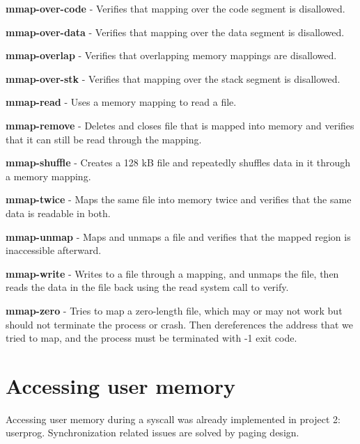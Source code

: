 \textbf{mmap-over-code} - Verifies that mapping over the code segment is disallowed.


\textbf{mmap-over-data} - Verifies that mapping over the data segment is disallowed.


\textbf{mmap-overlap} - Verifies that overlapping memory mappings are disallowed.


\textbf{mmap-over-stk} - Verifies that mapping over the stack segment is disallowed.


\textbf{mmap-read} - Uses a memory mapping to read a file.


\textbf{mmap-remove} - Deletes and closes file that is mapped into memory and verifies that it can still be read through the mapping.


\textbf{mmap-shuffle} - Creates a 128 kB file and repeatedly shuffles data in it through a memory mapping.


\textbf{mmap-twice} - Maps the same file into memory twice and verifies that the same data is readable in both.


\textbf{mmap-unmap} - Maps and unmaps a file and verifies that the mapped region is inaccessible afterward.


\textbf{mmap-write} - Writes to a file through a mapping, and unmaps the file, then reads the data in the file back using the read system call to verify.


\textbf{mmap-zero} - Tries to map a zero-length file, which may or may not work but  should not terminate the process or crash.  Then dereferences the address that we tried to map, and the process must be terminated with -1 exit code. 

\section{Accessing user memory}

Accessing user memory during a syscall was already implemented in project 2: userprog. Synchronization related issues are solved by paging design.








	


